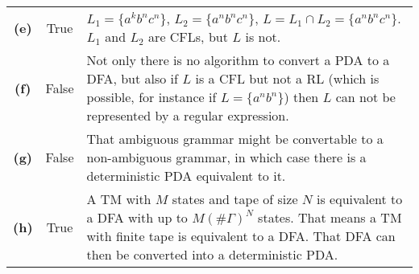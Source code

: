 \documentclass[docid=2017/18]{tcom_exam}
\begin{document}
{\begin{center}
\begin{tabular}{c | c p{130mm}}
		\textbf{(e)} & True  & $L_1=\{a^k b^n c^n\}$, $L_2=\{a^n b^n c^n\}$, $L=L_1 \cap L_2 = \{a^n b^n c^n\}$. $L_1$ and $L_2$ are CFLs, but $L$ is not. \\
		\textbf{(f)} & False & Not only there is no algorithm to convert a PDA to a DFA, but also if $L$ is a CFL but not a RL (which is possible, for instance if $L=\{a^n b^n\}$) then $L$ can not be represented by a regular expression.\\
		\textbf{(g)} & False & That ambiguous grammar might be convertable to a non-ambiguous grammar, in which case there is a deterministic PDA equivalent to it.\\
		\textbf{(h)} & True  & A TM with $M$ states and tape of size $N$ is equivalent to a DFA with up to $M(\#\Gamma)^N$ states. That means a TM with finite tape is equivalent to a DFA. That DFA can then be converted into a deterministic PDA. 
	\end{tabular}
\end{center}
}
\end{document}
